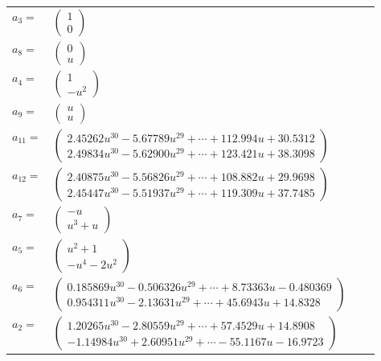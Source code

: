 \documentclass[1p]{elsarticle_modified}
\theoremstyle{definition}
\begin{document}
\begin{tabular}{m{7pt} m{180pt} m{7pt} m{180pt} }
\flushright $a_{3}=$&$\begin{pmatrix}1\\0\end{pmatrix}$ \\
\flushright $a_{8}=$&$\begin{pmatrix}0\\u\end{pmatrix}$ \\
\flushright $a_{4}=$&$\begin{pmatrix}1\\- u^2\end{pmatrix}$ \\
\flushright $a_{9}=$&$\begin{pmatrix}u\\u\end{pmatrix}$ \\
\flushright $a_{11}=$&$\begin{pmatrix}2.45262 u^{30}-5.67789 u^{29}+\cdots+112.994 u+30.5312\\2.49834 u^{30}-5.62900 u^{29}+\cdots+123.421 u+38.3098\end{pmatrix}$ \\
\flushright $a_{12}=$&$\begin{pmatrix}2.40875 u^{30}-5.56826 u^{29}+\cdots+108.882 u+29.9698\\2.45447 u^{30}-5.51937 u^{29}+\cdots+119.309 u+37.7485\end{pmatrix}$ \\
\flushright $a_{7}=$&$\begin{pmatrix}- u\\u^3+u\end{pmatrix}$ \\
\flushright $a_{5}=$&$\begin{pmatrix}u^2+1\\- u^4-2 u^2\end{pmatrix}$ \\
\flushright $a_{6}=$&$\begin{pmatrix}0.185869 u^{30}-0.506326 u^{29}+\cdots+8.73363 u-0.480369\\0.954311 u^{30}-2.13631 u^{29}+\cdots+45.6943 u+14.8328\end{pmatrix}$ \\
\flushright $a_{2}=$&$\begin{pmatrix}1.20265 u^{30}-2.80559 u^{29}+\cdots+57.4529 u+14.8908\\-1.14984 u^{30}+2.60951 u^{29}+\cdots-55.1167 u-16.9723\end{pmatrix}$ \\

\end{tabular}
\end{document}
